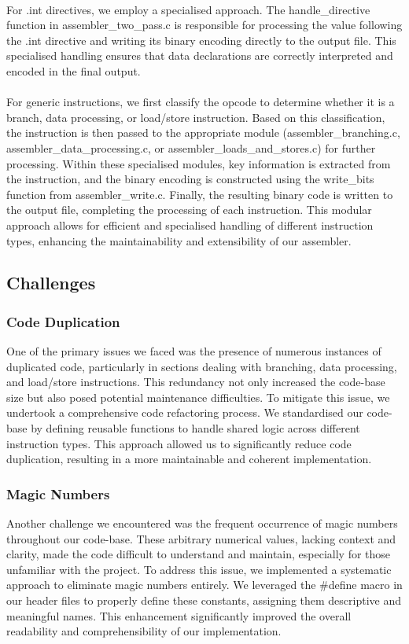 \documentclass[10pt]{article}
\begin{document}
\\
For .int directives, we employ a specialised approach. The handle\_directive function in assembler\_two\_pass.c is responsible for processing the value following the .int directive and writing its binary encoding directly to the output file. This specialised handling ensures that data declarations are correctly interpreted and encoded in the final output. \\
\\
For generic instructions, we first classify the opcode to determine whether it is a branch, data processing, or load/store instruction. Based on this classification, the instruction is then passed to the appropriate module (assembler\_branching.c, assembler\_data\_processing.c, or assembler\_loads\_and\_stores.c) for further processing. Within these specialised modules, key information is extracted from the instruction, and the binary encoding is constructed using the write\_bits function from assembler\_write.c. Finally, the resulting binary code is written to the output file, completing the processing of each instruction. This modular approach allows for efficient and specialised handling of different instruction types, enhancing the maintainability and extensibility of our assembler.

\subsection{Challenges}

\subsubsection{Code Duplication}
One of the primary issues we faced was the presence of numerous instances of duplicated code, particularly in sections dealing with branching, data processing, and load/store instructions. This redundancy not only increased the code-base size but also posed potential maintenance difficulties. To mitigate this issue, we undertook a comprehensive code refactoring process. We standardised our code-base by defining reusable functions to handle shared logic across different instruction types. This approach allowed us to significantly reduce code duplication, resulting in a more maintainable and coherent implementation.

\subsubsection{Magic Numbers}
Another challenge we encountered was the frequent occurrence of magic numbers throughout our code-base. These arbitrary numerical values, lacking context and clarity, made the code difficult to understand and maintain, especially for those unfamiliar with the project. To address this issue, we implemented a systematic approach to eliminate magic numbers entirely. We leveraged the \#define macro in our header files to properly define these constants, assigning them descriptive and meaningful names. This enhancement significantly improved the overall readability and comprehensibility of our implementation.
\end{document}

